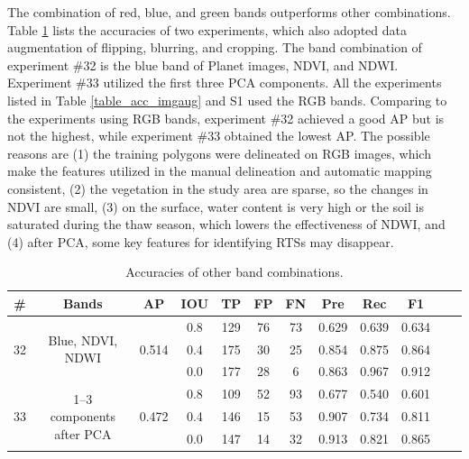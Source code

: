 \documentclass[preprint,12pt,authoryear]{elsarticle}
\begin{document}
The combination of red, blue, and green bands outperforms other combinations.
Table \ref{table_acc_otherbands} lists the accuracies of two experiments, which also adopted data augmentation of flipping, blurring, and cropping. The band combination of experiment \#32 is the blue band of Planet images, NDVI, and NDWI. Experiment \#33 utilized the first three PCA components. All the experiments listed in Table \ref{table_acc_imgaug} and S1 used the RGB bands. Comparing to the experiments using RGB bands, experiment \#32 achieved a good AP but is not the highest, while experiment \#33 obtained the lowest AP. The possible reasons are (1) the training polygons were delineated on RGB images, which make the features utilized in the manual delineation and automatic mapping consistent, (2) the vegetation in the study area are sparse, so the changes in NDVI are small, (3) on the surface, water content is very high or the soil is saturated during the thaw season, which lowers the effectiveness of NDWI, and (4) after PCA, some key features for identifying RTSs may disappear. 

\begin{table}[ht]
\footnotesize
\caption{Accuracies of other band combinations.}
\label{table_acc_otherbands}
\begin{tabular}{c c c c  c ccc c c c c}
\toprule
\textbf{\#}&\textbf{Bands}&\textbf{AP}&\textbf{IOU}&\textbf{TP}&\textbf{FP}&\textbf{FN}&\textbf{Pre}&\textbf{Rec}&\textbf{F1}\\
\midrule

\multirow{3}{*}{32} &  \multirow{3}{3cm}{Blue, NDVI, NDWI} & \multirow{3}{*}{0.514}  &0.8&129&76&73&0.629 &0.639 &0.634   \\
 &  &  &0.4&175&30&25&0.854 &0.875 &0.864  \\
 &  &  &0.0&177&28&6&0.863 &0.967 &0.912   \\
 
\midrule

\multirow{3}{*}{33} &  \multirow{3}{3cm}{1--3 components after PCA} & \multirow{3}{*}{0.472} &0.8&109&52&93&0.677 &0.540 &0.601  \\
 &  &  &0.4&146&15&53&0.907 &0.734 &0.811  \\
 &  & &0.0&147&14&32&0.913 &0.821 &0.865  \\

\bottomrule
\end{tabular}

\end{table}
\end{document}
